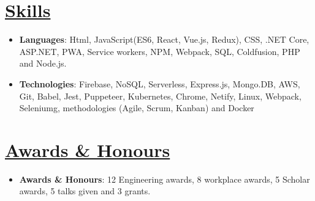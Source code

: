 \documentclass[letterpaper,11pt]{article}
\newcommand{\resumeItem}[2]{
  \item\small{
    \textbf{#1}{: #2 \vspace{-2pt}}
  }
}
\newcommand{\resumeSubItem}[2]{\resumeItem{#1}{#2}\vspace{-4pt}}
\newcommand{\resumeSubHeadingListStart}{\begin{itemize}[leftmargin=*]}
\newcommand{\resumeSubHeadingListEnd}{\end{itemize}}
\begin{document}
\section{\href{https://robertgabriel.ninja/\#skills}{Skills}}
\resumeSubHeadingListStart
\resumeSubItem{Languages}{Html, JavaScript(ES6, React, Vue.js, Redux), CSS, .NET Core, ASP.NET, PWA, Service workers, NPM, Webpack, SQL, Coldfusion, PHP and Node.js.}

\resumeSubItem{Technologies}{Firebase, NoSQL, Serverless, Express.js, Mongo.DB, AWS, Git, Babel, Jest, Puppeteer, Kubernetes, Chrome, Netify,  Linux, Webpack, Seleniumg, methodologies (Agile,
Scrum, Kanban) and Docker}
\resumeSubHeadingListEnd


\section{\href{https://robertgabriel.ninja/awards}{Awards \& Honours}}
\resumeSubHeadingListStart
\resumeSubItem{Awards \& Honours}{12 Engineering awards, 8 workplace awards, 5 Scholar awards, 5 talks given and 3 grants.}

\resumeSubHeadingListEnd


\end{document}
